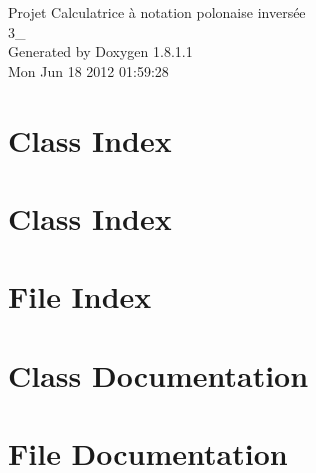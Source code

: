 \documentclass{book}
\begin{document}
\hypersetup{pageanchor=false,citecolor=blue}
\begin{titlepage}
\vspace*{7cm}
\begin{center}
{\Large Projet Calculatrice à notation polonaise inversée \\[1ex]\large 3\-\_ }\\
\vspace*{1cm}
{\large Generated by Doxygen 1.8.1.1}\\
\vspace*{0.5cm}
{\small Mon Jun 18 2012 01:59:28}\\
\end{center}
\end{titlepage}
\clearemptydoublepage
{}
\tableofcontents
\clearemptydoublepage
{}
\hypersetup{pageanchor=true,citecolor=blue}
\chapter{Class Index}

\chapter{Class Index}

\chapter{File Index}

\chapter{Class Documentation}

















\chapter{File Documentation}

\printindex
\end{document}
